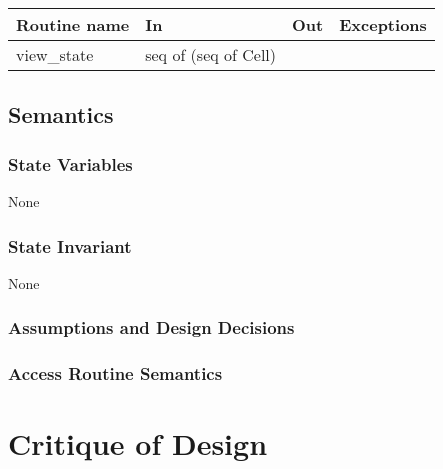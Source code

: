 \documentclass[12pt]{article}
\begin{document}
\begin{tabular}{| l | l | l | p{5cm} |}
\hline
\textbf{Routine name} & \textbf{In} & \textbf{Out} & \textbf{Exceptions}\\
\hline
view\_state & seq of (seq of Cell) & &\\
\hline
\end{tabular}

\subsection* {Semantics}

\subsubsection* {State Variables}

None

\subsubsection* {State Invariant}

None

\subsubsection* {Assumptions and Design Decisions}

\subsubsection* {Access Routine Semantics}

\newpage

\section*{Critique of Design}
\end{document}
